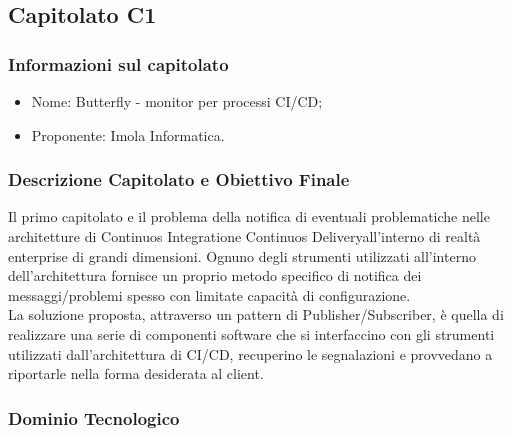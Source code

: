 \subsection{Capitolato C1}

\subsubsection{Informazioni sul capitolato}
\begin{itemize}
	\item Nome: Butterfly - monitor per processi CI/CD;
	\item Proponente: Imola Informatica.
\end{itemize}

\subsubsection{Descrizione Capitolato e Obiettivo Finale}
Il primo capitolato e il problema della notifica di eventuali problematiche nelle architetture di Continuos Integration\glossario e Continuos Delivery\glossario all'interno di realtà enterprise di grandi dimensioni. Ognuno degli strumenti utilizzati all'interno dell'architettura fornisce un proprio metodo specifico di notifica dei messaggi/problemi spesso con limitate capacità di configurazione.\\
La soluzione proposta, attraverso un pattern di Publisher/Subscriber\glossario, è quella di realizzare una serie di componenti software che si interfaccino con gli strumenti utilizzati dall'architettura di CI/CD, recuperino  le segnalazioni e provvedano a riportarle nella forma desiderata al client.  
\subsubsection{Dominio Tecnologico}


